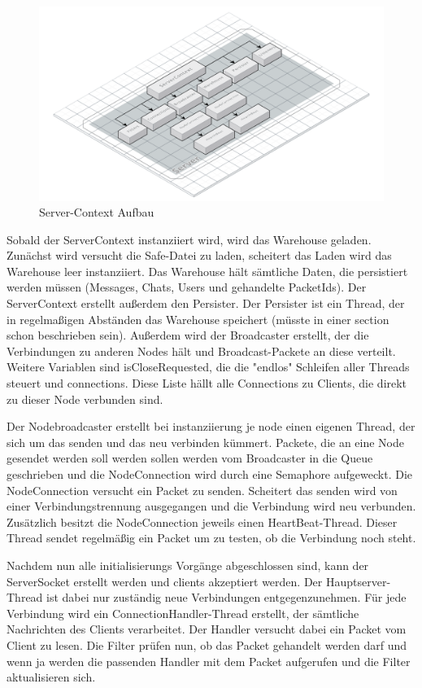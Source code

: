 \documentclass[a4paper]{article}
\theoremstyle{definition}
\begin{document}
    \begin{figure}[h]
        \centering
        \includegraphics[width=\textwidth]{VS-Server-Context.png}
        
        \caption{Server-Context Aufbau}
        \label{}
    \end{figure}

    Sobald der ServerContext instanziiert wird, wird das Warehouse geladen. Zunächst wird versucht die Safe-Datei zu laden, scheitert das Laden wird das Warehouse leer instanziiert. Das Warehouse hält sämtliche Daten, die persistiert werden müssen (Messages, Chats, Users und gehandelte PacketIds). Der ServerContext erstellt außerdem den Persister. Der Persister ist ein Thread, der in regelmaßigen Abständen das Warehouse speichert (müsste in einer section schon beschrieben sein). Außerdem wird der Broadcaster erstellt, der die Verbindungen zu anderen Nodes hält und Broadcast-Packete an diese verteilt.
    Weitere Variablen sind isCloseRequested, die die "endlos" Schleifen aller Threads steuert und connections. Diese Liste hällt alle Connections zu Clients, die direkt zu dieser Node verbunden sind.

    Der Nodebroadcaster erstellt bei instanziierung je node einen eigenen Thread, der sich um das senden und das neu verbinden kümmert.
    Packete, die an eine Node gesendet werden soll werden sollen werden vom Broadcaster in die Queue geschrieben und die NodeConnection wird durch eine Semaphore aufgeweckt. Die NodeConnection versucht ein Packet zu senden. Scheitert das senden wird von einer Verbindungstrennung ausgegangen und die Verbindung wird neu verbunden.
    Zusätzlich besitzt die NodeConnection jeweils einen HeartBeat-Thread. Dieser Thread sendet regelmäßig ein Packet um zu testen, ob die Verbindung noch steht.

    Nachdem nun alle initialisierungs Vorgänge abgeschlossen sind, kann der ServerSocket erstellt werden und clients akzeptiert werden.
    Der Hauptserver-Thread ist dabei nur zuständig neue Verbindungen entgegenzunehmen. Für jede Verbindung wird ein ConnectionHandler-Thread erstellt, der sämtliche Nachrichten des Clients verarbeitet. Der Handler versucht dabei ein Packet vom Client zu lesen. Die Filter prüfen nun, ob das Packet gehandelt werden darf und wenn ja werden die passenden Handler mit dem Packet aufgerufen und die Filter aktualisieren sich.
\end{document}
